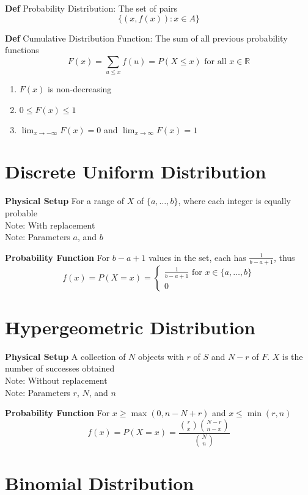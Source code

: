 \documentclass[11pt,notitlepage]{report}
\begin{document}
\textbf{Def} Probability Distribution: The set of pairs
$$\{(x, f(x)): x\in A\}$$

\textbf{Def} Cumulative Distribution Function: The sum of all previous probability functions
$$F(x) = \sum_{u \leq x}f(u) = P(X \leq x) \text{ for all } x \in \mathbb R$$
\begin{enumerate}
    \item $F(x)$ is non-decreasing
    \item $0 \leq F(x) \leq 1$
    \item $\lim_{x \rightarrow -\infty} F(x) = 0$ and $\lim_{x \rightarrow \infty} F(x) = 1$
\end{enumerate}

\section{Discrete Uniform Distribution}

\textbf{Physical Setup} For a range of $X$ of $\{a, \dots, b\}$, where each integer is equally probable\\
\hspace*{5mm} Note: With replacement\\
\hspace*{5mm} Note: Parameters $a$, and $b$

\textbf{Probability Function} For $b-a+1$ values in the set, each has $\frac{1}{b-a+1}$, thus
$$f(x) = P(X = x) = \begin{cases}\frac{1}{b-a+1} \text{ for $x \in \{a, \dots, b$\}}\\0\end{cases}$$

\section{Hypergeometric Distribution}

\textbf{Physical Setup} A collection of $N$ objects with $r$ of $S$ and $N - r$ of $F$. $X$ is the number of successes obtained\\
\hspace*{5mm} Note: Without replacement\\
\hspace*{5mm} Note: Parameters $r$, $N$, and $n$

\textbf{Probability Function} For $x \geq \max(0, n-N+r)$ and $x \leq \min(r, n)$
$$f(x) = P(X = x) = \frac{\binom{r}{x}\binom{N-r}{n-x}}{\binom{N}{n}}$$

\section{Binomial Distribution}
\end{document}
